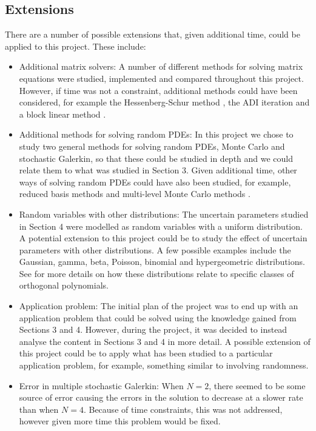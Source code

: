 \documentclass[11pt]{article}
\numberwithin{equation}{section}
\begin{document}
\subsection{Extensions}
There are a number of possible extensions that, given additional time, could be applied to this project. These include:
\begin{itemize}
\item Additional matrix solvers: A number of different methods for solving matrix equations were studied, implemented and compared throughout this project. However, if time was not a constraint, additional methods could have been considered, for example the Hessenberg-Schur method \cite{Hessenberg}, the ADI iteration \cite{Simoncini} and a block linear method \cite{Monsalve}.
\item Additional methods for solving random PDEs: In this project we chose to study two general methods for solving random PDEs, Monte Carlo and stochastic Galerkin, so that these could be studied in depth and we could relate them to what was studied in Section 3. Given additional time, other ways of solving random PDEs could have also been studied, for example, reduced basis methods \cite{Powell} and multi-level Monte Carlo methods \cite{Barth}.
\item Random variables with other distributions: The uncertain parameters studied in Section 4 were modelled as random variables with a uniform distribution. A potential extension to this project could be to study the effect of uncertain parameters with other distributions. A few possible examples include the Gaussian, gamma, beta, Poisson, binomial and hypergeometric distributions. See \cite{Xiu} for more details on how these distributions relate to specific classes of orthogonal polynomials.
\item Application problem: The initial plan of the project was to end up with an application problem that could be solved using the knowledge gained from Sections 3 and 4. However, during the project, it was decided to instead analyse the content in Sections 3 and 4 in more detail. A possible extension of this project could be to apply what has been studied to a particular application problem, for example, something similar to \cite{Barreira} involving randomness.
\item Error in multiple stochastic Galerkin: When $N=2$, there seemed to be some source of error causing the errors in the solution to decrease at a slower rate than when $N=4$. Because of time constraints, this was not addressed, however given more time this problem would be fixed. 
\end{itemize}
\end{document}
